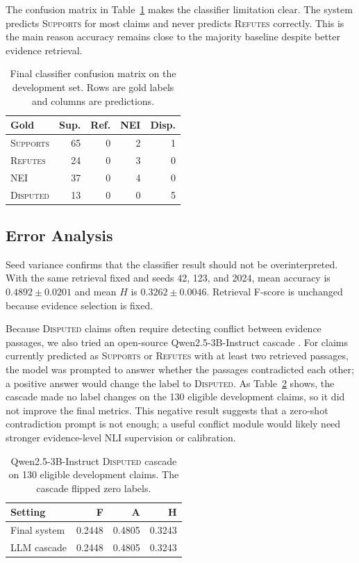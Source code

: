 \documentclass[11pt]{article}
\begin{document}
The confusion matrix in Table~\ref{tab:confusion} makes the classifier limitation clear. The system predicts \textsc{Supports} for most claims and never predicts \textsc{Refutes} correctly. This is the main reason accuracy remains close to the majority baseline despite better evidence retrieval.

\begin{table}[t]
  \centering
  \small
  \setlength{\tabcolsep}{3pt}
  \begin{tabular}{lrrrr}
    \toprule
    \textbf{Gold} & \textbf{Sup.} & \textbf{Ref.} & \textbf{NEI} & \textbf{Disp.} \\
    \midrule
    \textsc{Supports} & 65 & 0 & 2 & 1 \\
    \textsc{Refutes} & 24 & 0 & 3 & 0 \\
    \textsc{NEI} & 37 & 0 & 4 & 0 \\
    \textsc{Disputed} & 13 & 0 & 0 & 5 \\
    \bottomrule
  \end{tabular}
  \caption{Final classifier confusion matrix on the development set. Rows are gold labels and columns are predictions.}
  \label{tab:confusion}
\end{table}

\subsection{Error Analysis}

Seed variance confirms that the classifier result should not be overinterpreted. With the same retrieval fixed and seeds 42, 123, and 2024, mean accuracy is $0.4892 \pm 0.0201$ and mean $H$ is $0.3262 \pm 0.0046$. Retrieval F-score is unchanged because evidence selection is fixed.

Because \textsc{Disputed} claims often require detecting conflict between evidence passages, we also tried an open-source Qwen2.5-3B-Instruct cascade \citep{qwen_qwen25_2025}. For claims currently predicted as \textsc{Supports} or \textsc{Refutes} with at least two retrieved passages, the model was prompted to answer whether the passages contradicted each other; a positive answer would change the label to \textsc{Disputed}. As Table~\ref{tab:llm-cascade} shows, the cascade made no label changes on the 130 eligible development claims, so it did not improve the final metrics. This negative result suggests that a zero-shot contradiction prompt is not enough; a useful conflict module would likely need stronger evidence-level NLI supervision or calibration.
\begin{table}[H]
  \centering
  \small
  \begin{tabular}{lrrr}
    \toprule
    \textbf{Setting} & \textbf{F} & \textbf{A} & \textbf{H} \\
    \midrule
    Final system & 0.2448 & 0.4805 & 0.3243 \\
    LLM cascade & 0.2448 & 0.4805 & 0.3243 \\
    \bottomrule
  \end{tabular}
  \caption{Qwen2.5-3B-Instruct \textsc{Disputed} cascade on 130 eligible development claims. The cascade flipped zero labels.}
  \label{tab:llm-cascade}
\end{table}
\end{document}

